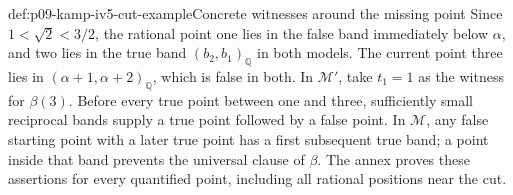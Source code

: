 \begin{hbexample}{def:p09-kamp-iv5-cut-example}{Concrete witnesses around the missing point}
Since \(1<\sqrt2<3/2\), the rational point one lies in
the false band immediately below \(\alpha\), and two lies
in the true band \((b_2,b_1)_{\mathbb Q}\) in both models.
The current point three lies in
\((\alpha+1,\alpha+2)_{\mathbb Q}\), which is false in
both. In \(\mathcal M'\), take \(t_1=1\) as the witness
for \(\beta(3)\). Before every true point between one and
three, sufficiently small reciprocal bands supply a true point
followed by a false point. In \(\mathcal M\), any false
starting point with a later true point has a first subsequent
true band; a point inside that band prevents the universal clause
of \(\beta\). The annex proves these assertions for every
quantified point, including all rational positions near the cut.
\end{hbexample}
